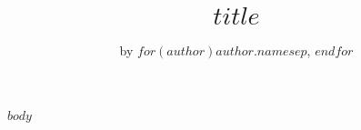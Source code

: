 \documentclass[a4paper]{article}
\makeatletter
\renewcommand{\maketitle}{\bgroup\setlength{\parindent}{0pt}
\begin{flushleft}
  \textsc{\Large \@title }

  \large \textbf{\@author}

  \textsc{\normalsize \@date }

  \hrulefill
\end{flushleft}\egroup
}
\makeatother
\begin{document}


% 

\vspace{80 mm}

\title{$title$}
\author{by $for(author)$$author.name$$sep$, $endfor$}

\maketitle


$body$


\end{document}
